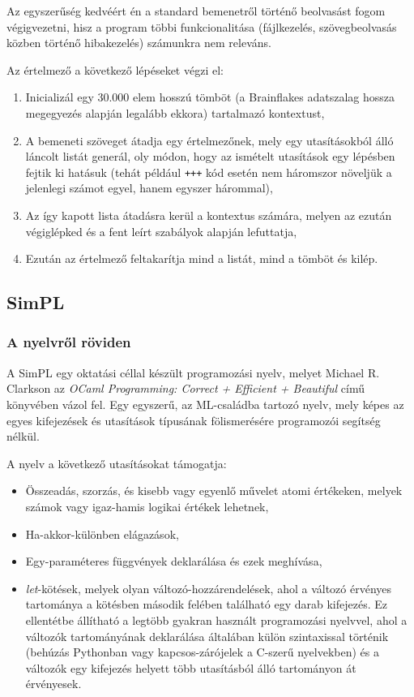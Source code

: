 Az egyszerűség kedvéért én a standard bemenetről történő beolvasást fogom végigvezetni, hisz a program többi funkcionalitása (fájlkezelés, szövegbeolvasás közben történő hibakezelés) számunkra nem releváns.

Az értelmező a következő lépéseket végzi el:

\begin{enumerate}
    \item Inicializál egy 30.000 elem hosszú tömböt (a Brainflakes adatszalag hossza megegyezés alapján legalább ekkora) tartalmazó kontextust,
    \item A bemeneti szöveget átadja egy értelmezőnek, mely egy utasításokból álló láncolt listát generál, oly módon, hogy az ismételt utasítások egy lépésben fejtik ki hatásuk (tehát például \texttt{+++} kód esetén nem háromszor növeljük a jelenlegi számot egyel, hanem egyszer hárommal),
    \item Az így kapott lista átadásra kerül a kontextus számára, melyen az ezután végiglépked és a fent leírt szabályok alapján lefuttatja,
    \item Ezután az értelmező feltakarítja mind a listát, mind a tömböt és kilép.
\end{enumerate}

\subsection{SimPL}

\subsubsection{A nyelvről röviden}

A SimPL egy oktatási céllal készült programozási nyelv, melyet Michael R. Clarkson az \textit{OCaml Programming: Correct + Efficient + Beautiful} című könyvében\cite{ocaml} vázol fel. Egy egyszerű, az ML-családba tartozó nyelv, mely képes az egyes kifejezések és utasítások típusának fölismerésére programozói segítség nélkül.

A nyelv a következő utasításokat támogatja:

\begin{itemize}
    \item Összeadás, szorzás, és kisebb vagy egyenlő művelet atomi értékeken, melyek számok vagy igaz-hamis logikai értékek lehetnek,
    \item Ha-akkor-különben elágazások,
    \item Egy-paraméteres függvények deklarálása és ezek meghívása, 
    \item \textit{let}-kötések, melyek olyan változó-hozzárendelések, ahol a változó érvényes tartománya a kötésben második felében található egy darab kifejezés. Ez ellentétbe állítható a legtöbb gyakran használt programozási nyelvvel, ahol a változók tartományának deklarálása általában külön szintaxissal történik (behúzás Pythonban vagy kapcsos-zárójelek a C-szerű nyelvekben) és a változók egy kifejezés helyett több utasításból álló tartományon át érvényesek.
\end{itemize}

